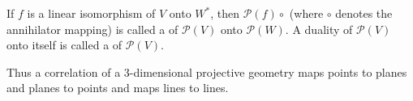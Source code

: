 If $f$ is a linear isomorphism of $V$ onto $W^*$, then $\mathcal{P}(f) \circ$ (where $\circ$ denotes the annihilator mapping) is called a  of $\mathcal{P}(V)$ onto $\mathcal{P}(W)$. A duality of $\mathcal{P}(V)$ onto itself is called a  of $\mathcal{P}(V)$.

Thus a correlation of a $3$-dimensional projective geometry maps points to planes and planes to points and maps lines to lines.
